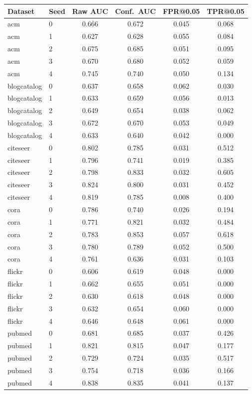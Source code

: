 \begin{tabular}{llcccc}
\toprule
Dataset & Seed & Raw AUC & Conf.\ AUC & FPR@0.05 & TPR@0.05 \\
\midrule
acm & 0 & 0.666 & 0.672 & 0.045 & 0.068 \\
acm & 1 & 0.627 & 0.628 & 0.055 & 0.084 \\
acm & 2 & 0.675 & 0.685 & 0.051 & 0.095 \\
acm & 3 & 0.670 & 0.680 & 0.052 & 0.059 \\
acm & 4 & 0.745 & 0.740 & 0.050 & 0.134 \\
blogcatalog & 0 & 0.637 & 0.658 & 0.062 & 0.030 \\
blogcatalog & 1 & 0.633 & 0.659 & 0.056 & 0.013 \\
blogcatalog & 2 & 0.649 & 0.654 & 0.038 & 0.062 \\
blogcatalog & 3 & 0.672 & 0.670 & 0.053 & 0.049 \\
blogcatalog & 4 & 0.633 & 0.640 & 0.042 & 0.000 \\
citeseer & 0 & 0.802 & 0.785 & 0.031 & 0.512 \\
citeseer & 1 & 0.796 & 0.741 & 0.019 & 0.385 \\
citeseer & 2 & 0.798 & 0.833 & 0.032 & 0.605 \\
citeseer & 3 & 0.824 & 0.800 & 0.031 & 0.452 \\
citeseer & 4 & 0.819 & 0.785 & 0.008 & 0.400 \\
cora & 0 & 0.786 & 0.740 & 0.026 & 0.194 \\
cora & 1 & 0.771 & 0.821 & 0.032 & 0.484 \\
cora & 2 & 0.783 & 0.853 & 0.057 & 0.618 \\
cora & 3 & 0.780 & 0.789 & 0.052 & 0.500 \\
cora & 4 & 0.761 & 0.636 & 0.031 & 0.103 \\
flickr & 0 & 0.606 & 0.619 & 0.048 & 0.000 \\
flickr & 1 & 0.662 & 0.655 & 0.051 & 0.000 \\
flickr & 2 & 0.630 & 0.618 & 0.048 & 0.000 \\
flickr & 3 & 0.632 & 0.654 & 0.060 & 0.000 \\
flickr & 4 & 0.646 & 0.648 & 0.061 & 0.000 \\
pubmed & 0 & 0.681 & 0.685 & 0.037 & 0.426 \\
pubmed & 1 & 0.821 & 0.815 & 0.047 & 0.177 \\
pubmed & 2 & 0.729 & 0.724 & 0.035 & 0.517 \\
pubmed & 3 & 0.754 & 0.718 & 0.036 & 0.166 \\
pubmed & 4 & 0.838 & 0.835 & 0.041 & 0.137 \\
\bottomrule
\end{tabular}
